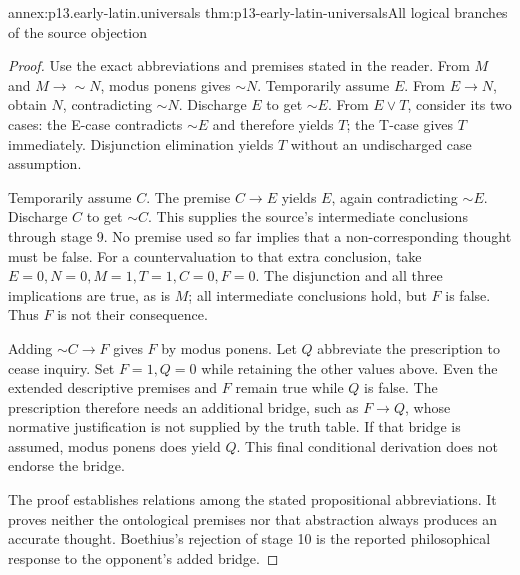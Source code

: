 \begin{annexitem}{annex:p13.early-latin.universals}
 {thm:p13-early-latin-universals}{All logical branches of the source objection}
\begin{proof}
Use the exact abbreviations and premises stated in the reader.
From \(M\) and \(M\to\sim N\), modus ponens gives \(\sim N\).
Temporarily assume \(E\). From \(E\to N\), obtain \(N\),
contradicting \(\sim N\). Discharge \(E\) to get \(\sim E\).
From \(E\lor T\), consider its two cases: the E-case contradicts
\(\sim E\) and therefore yields \(T\); the T-case gives \(T\) immediately.
Disjunction elimination yields \(T\) without an undischarged case assumption.

Temporarily assume \(C\). The premise \(C\to E\) yields \(E\),
again contradicting \(\sim E\). Discharge \(C\) to get \(\sim C\).
This supplies the source's intermediate conclusions through stage 9.
No premise used so far implies that a non-corresponding thought must be false.
For a countervaluation to that extra conclusion, take
\(E=0,N=0,M=1,T=1,C=0,F=0\).
The disjunction and all three implications are true, as is \(M\);
all intermediate conclusions hold, but \(F\) is false.
Thus \(F\) is not their consequence.

Adding \(\sim C\to F\) gives \(F\) by modus ponens.
Let \(Q\) abbreviate the prescription to cease inquiry.
Set \(F=1,Q=0\) while retaining the other values above.
Even the extended descriptive premises and \(F\) remain true while \(Q\)
is false. The prescription therefore needs an additional bridge, such as
\(F\to Q\), whose normative justification is not supplied by the truth table.
If that bridge is assumed, modus ponens does yield \(Q\).
This final conditional derivation does not endorse the bridge.

The proof establishes relations among the stated propositional abbreviations.
It proves neither the ontological premises nor that abstraction always
produces an accurate thought. Boethius's rejection of stage 10 is the
reported philosophical response to the opponent's added bridge.
\end{proof}
\end{annexitem}

